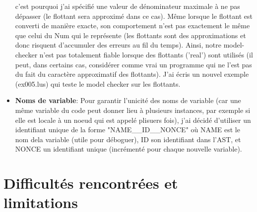 \documentclass[a4paper]{article}%
\begin{document}
\begin{itemize}
		c'est pourquoi j'ai spécifié une valeur de dénominateur maximale à ne pas dépasser (le flottant sera approximé dans ce cas).
		Même lorsque le flottant est converti de manière exacte, son comportement n'est pas exactement le même que celui du Num qui le représente
		(les flottants sont des approximations et donc risquent d'accumuler des erreurs au fil du temps).
		Ainsi, notre model-checker n'est pas totalement fiable lorsque des flottants ('real') sont utilisés (il peut, dans certains cas, considérer comme vrai
		un programme qui ne l'est pas du fait du caractère approximatif des flottants). J'ai écris un nouvel exemple (ex005.lus) qui teste le model checker sur les flottants.\\
		\item \textbf{Noms de variable}: Pour garantir l'unicité des noms de variable (car une même variable du code peut donner lieu à plusieurs instances,
		par exemple si elle est locale à un noeud qui est appelé plisuers fois), j'ai décidé d'utiliser un identifiant unique de la forme "NAME\_\_ID\_\_NONCE"
		où NAME est le nom dela variable (utile pour déboguer), ID son identifiant dans l'AST, et NONCE un identifiant unique (incrémenté pour chaque nouvelle variable).
	\end{itemize}

	\section{Difficultés rencontrées et limitations}
\end{document}
